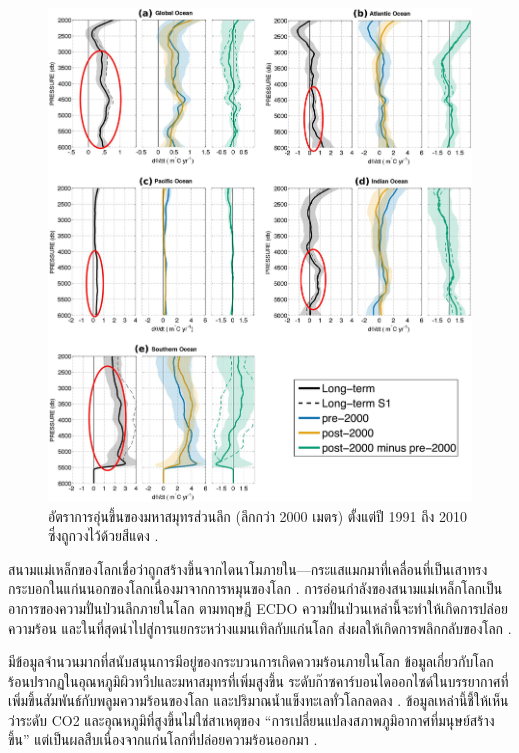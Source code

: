 \documentclass[10pt,twocolumn,letterpaper]{article}
\begin{document}
\begin{figure}[t]
\begin{center}
   \includegraphics[width=1\linewidth]{ocean-highlight.jpg}
\end{center}
   \caption{อัตราการอุ่นขึ้นของมหาสมุทรส่วนลึก (ลึกกว่า 2000 เมตร) ตั้งแต่ปี 1991 ถึง 2010 ซึ่งถูกวงไว้ด้วยสีแดง \cite{132}.}
\label{fig:15}
\label{fig:onecol}
\end{figure}

สนามแม่เหล็กของโลกเชื่อว่าถูกสร้างขึ้นจากไดนาโมภายใน—กระแสแมกมาที่เคลื่อนที่เป็นเสาทรงกระบอกในแก่นนอกของโลกเนื่องมาจากการหมุนของโลก \cite{123}. การอ่อนกำลังของสนามแม่เหล็กโลกเป็นอาการของความปั่นป่วนลึกภายในโลก ตามทฤษฎี ECDO ความปั่นป่วนเหล่านี้จะทำให้เกิดการปล่อยความร้อน และในที่สุดนำไปสู่การแยกระหว่างแมนเทิลกับแก่นโลก ส่งผลให้เกิดการพลิกกลับของโลก \cite{1}.

มีข้อมูลจำนวนมากที่สนับสนุนการมีอยู่ของกระบวนการเกิดความร้อนภายในโลก ข้อมูลเกี่ยวกับโลกร้อนปรากฏในอุณหภูมิผิวทวีปและมหาสมุทรที่เพิ่มสูงขึ้น \cite{127,128} ระดับก๊าซคาร์บอนไดออกไซด์ในบรรยากาศที่เพิ่มขึ้นสัมพันธ์กับพลูมความร้อนของโลก \cite{129,130} และปริมาณน้ำแข็งทะเลทั่วโลกลดลง \cite{131}. ข้อมูลเหล่านี้ชี้ให้เห็นว่าระดับ CO2 และอุณหภูมิที่สูงขึ้นไม่ใช่สาเหตุของ “การเปลี่ยนแปลงสภาพภูมิอากาศที่มนุษย์สร้างขึ้น” แต่เป็นผลสืบเนื่องจากแก่นโลกที่ปล่อยความร้อนออกมา \cite{129}.
\end{document}
